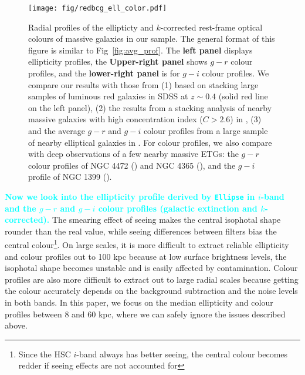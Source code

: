 \documentclass[fleqn,usenatbib]{mnras}
\newcommand{\song}[1]{\textcolor{cyan}{\textbf{#1}}}
\begin{document}
  \begin{figure}
      \centering 
      \texttt{[image: fig/redbcg\_ell\_color.pdf]}
      \caption{
          Radial profiles of the ellipticty and $k$-corrected rest-frame optical colours 
          of massive galaxies in our sample. 
          The general format of this figure is similar to Fig~\ref{fig:avg_prof}.  
          The \textbf{left panel} displays ellipticity profiles, 
          the \textbf{Upper-right panel} shows $g-r$ colour profiles, and  the
          \textbf{lower-right panel} is for $g-i$ colour profiles. 
          We compare our results with those from (1) \citet{Tal2011} based on stacking 
          large samples of luminous red galaxies in SDSS at $z{\sim} 0.4$ 
          (solid red line on the left panel), 
          (2) the results from a stacking analysis of nearby massive 
          galaxies with high concentration index ($C>2.6$) in 
          \citet[][blue dash lines on the left and upper-right panels]{DSouza2014}, 
          (3) and the average $g-r$ and $g-i$ colour profiles 
          from a large sample of nearby elliptical galaxies in \citet[][blue, solid 
          lines on both right panels]{LaBarbera2010}.
          For colour profiles, we also compare with deep observations of a few nearby 
          massive ETGs: the $g-r$ colour profiles of NGC 4472 (\citealt{Mihos2013}) 
          and NGC 4365 (\citealt{Mihos2017}), and the $g-i$ profile of NGC 1399 
          (\citealt{Iodice2016}).
          }
      \label{fig:ell_color}
  \end{figure}
    
    
    \song{
    Now we look into the ellipticity profile derived by \texttt{Ellipse} in $i$-band 
    and the $g-r$ and $g-i$ colour profiles (galactic extinction and $k$-corrected). 
    }
	The smearing effect of seeing makes the central isophotal shape rounder than the 
	real value, while seeing differences between filters bias the central 
	colour\footnote{Since the HSC $i$-band always has better seeing, the central 
	colour becomes redder if seeing effects are not accounted for}. 
	On large scales, it is more difficult to extract reliable ellipticity and 
	colour profiles out to 100 kpc because at low surface brightness levels, the 
	isophotal shape becomes unstable and is easily affected by contamination. 
	Colour profiles are also more difficult to extract out to large radial scales
	because getting the colour accurately depends on the background subtraction and 
	the noise levels in both bands. 
	In this paper, we focus on the median ellipticity and colour profiles between 
	8 and 60 kpc, where we can safely ignore the issues described above. 
	 
\end{document}
